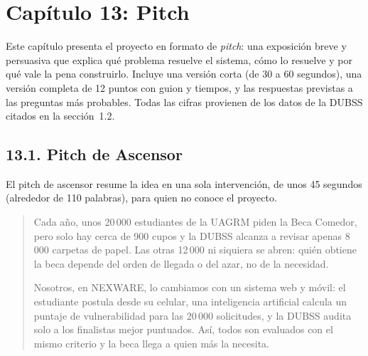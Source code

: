 
\newpage
\section{Capítulo 13: Pitch}\label{cap:pitch}


Este capítulo presenta el proyecto en formato de \textit{pitch}: una exposición breve y persuasiva que explica qué problema resuelve el sistema, cómo lo resuelve y por qué vale la pena construirlo. Incluye una versión corta (de 30 a 60 segundos), una versión completa de 12 puntos con guion y tiempos, y las respuestas previstas a las preguntas más probables. Todas las cifras provienen de los datos de la DUBSS citados en la sección~1.2.

\subsection{13.1. Pitch de Ascensor}

El pitch de ascensor resume la idea en una sola intervención, de unos 45 segundos (alrededor de 110 palabras), para quien no conoce el proyecto.

\begin{quote}
Cada año, unos 20\,000 estudiantes de la UAGRM piden la Beca Comedor, pero solo hay cerca de 900 cupos y la DUBSS alcanza a revisar apenas 8\,000 carpetas de papel. Las otras 12\,000 ni siquiera se abren: quién obtiene la beca depende del orden de llegada o del azar, no de la necesidad.

Nosotros, en NEXWARE, lo cambiamos con un sistema web y móvil: el estudiante postula desde su celular, una inteligencia artificial calcula un puntaje de vulnerabilidad para las 20\,000 solicitudes, y la DUBSS audita solo a los finalistas mejor puntuados. Así, todos son evaluados con el mismo criterio y la beca llega a quien más la necesita.
\end{quote}

